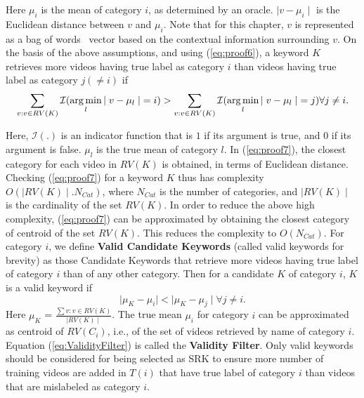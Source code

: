 Here $\mu_i$ is the mean of category $i$, as determined by an oracle. $ \mid v - \mu_i \mid$ is the Euclidean distance between $v$ and $\mu_i$. Note that for this chapter, $v$ is represented as a bag of words~\cite{salton1975vector} vector based on the contextual information surrounding $v$. On the basis of the above assumptions, and using (\ref{eq:proof6}), a keyword $K$ retrieves more videos having true label as category $i$ than videos having true label as category $j ( \neq  i)$ if
\begin{equation}
\sum_{v:v\in RV(K)}\mathcal{I}(\operatorname*{arg\,min}_l{\mid v-\mu_l \mid}=i) > \sum_{v:v\in RV(K)}\mathcal{I}(\operatorname*{arg\,min}_l{\mid v-\mu_l \mid}=j)  \forall j \neq i.
\label{eq:proof7}
\end{equation}

Here, $\mathcal{I}(.)$ is an indicator function that is $1$ if its argument is true, and $0$ if its argument is false. $\mu_l$ is the true mean of category $l$. In (\ref{eq:proof7}), the closest category for each video in $RV(K)$ is obtained, in terms of Euclidean distance. Checking (\ref{eq:proof7}) for a keyword $K$ thus has complexity $O( \mid RV(K) \mid.N_{Cat})$, where $N_{Cat}$ is the number of categories, and $\mid RV(K) \mid$ is the cardinality of the set $RV(K)$. In order to reduce the above high complexity, (\ref{eq:proof7}) can be approximated by obtaining the closest category of centroid of the set $RV(K)$. This reduces the complexity to $O(N_{Cat})$. For category $i$, we define \textbf{Valid Candidate Keywords} (called valid keywords for brevity) as those Candidate Keywords that retrieve more videos having true label of category $i$ than of any other category. Then for a candidate $K$ of category $i$, $K$ is a valid keyword if 
\begin{equation} \label{eq:ValidityFilter}
\mid \mu_K - \mu_i \mid < \mid \mu_K - \mu_j \mid \forall j \neq i. 
\end{equation}
Here $\mu_K$ =  $\frac{ \sum{v:v \in RV(K)} }{\mid RV(K) \mid}$. The true mean $\mu_i$ for category $i$ can be approximated as centroid of $RV(C_i)$, i.e., of the set of videos retrieved by name of category $i$. Equation (\ref{eq:ValidityFilter}) is called the \textbf{Validity Filter}. Only valid keywords should be considered for being selected as SRK to ensure more number of training videos are added in $T(i)$ that have true label of category $i$ than videos that are mislabeled as category $i$. 

